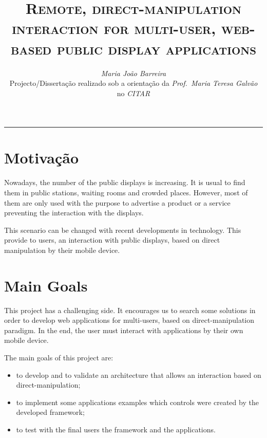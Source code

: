 \documentclass[9pt,a4paper]{extarticle}
\begin{document}
\title{\vspace*{-8mm}\textbf{\textsc{Remote, direct-manipulation
interaction for multi-user, web-based
public display applications}}}
\author{\emph{Maria João Barreira}\\[2mm]
\small{Projecto/Dissertação realizado sob a orientação da \emph{Prof.\ Maria Teresa Galvão}}\\
\small{no \emph{CITAR}}}
\date{}
\maketitle
\thispagestyle{empty}

\vspace*{-4mm}\noindent\rule{\textwidth}{0.4pt}\vspace*{4mm}

\begin{multicols}{2}

\section{Motivação}\label{sec:motiva}

Nowadays, the number of the public displays is increasing. It is usual to find them in public stations, waiting rooms and crowded places. 
However, most of them are only used with the purpose to advertise a product or a service preventing the interaction with the displays.

This scenario can be changed with recent developments in technology. This provide to users, an interaction with public displays, based on direct manipulation by their mobile device.

\section{Main Goals}\label{sec:goals}

This project has a challenging side. It encourages us to search some solutions in order to develop web applications for multi-users, based on direct-manipulation paradigm. 
In the end, the user must interact with applications by their own mobile device. 

The main goals of this project are:
\begin{itemize}
\item to develop and to validate an architecture that allows an interaction based on direct-manipulation;
\item to implement some applications examples which controls were created by the developed framework;
\item to test with the final users the framework and the applications.
\end{itemize}


\end{multicols}
\end{document}
